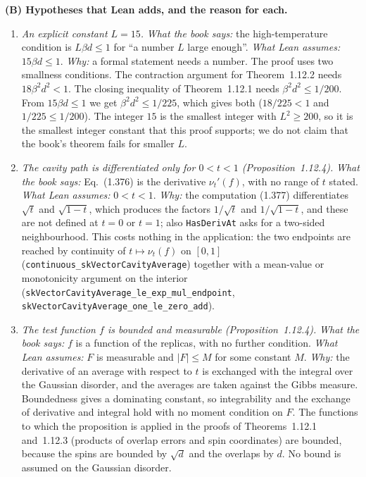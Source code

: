 \begin{remark}
\medskip\noindent\textbf{(B) Hypotheses that Lean adds, and the reason for each.}
\begin{enumerate}
\item \emph{An explicit constant $L=15$.}
\emph{What the book says:} the high-temperature condition is $L\beta d\le1$ for ``a number $L$ large enough''.
\emph{What Lean assumes:} $15\beta d\le1$.
\emph{Why:} a formal statement needs a number. The proof uses two smallness conditions. The contraction
argument for Theorem~1.12.2 needs $18\beta^2d^2<1$. The closing inequality of Theorem~1.12.1 needs
$\beta^2d^2\le 1/200$. From $15\beta d\le1$ we get $\beta^2d^2\le1/225$, which gives both
($18/225<1$ and $1/225\le1/200$). The integer $15$ is the smallest integer with $L^2\ge200$, so it is the
smallest integer constant that this proof supports; we do not claim that the book's theorem fails for
smaller $L$.
\item \emph{The cavity path is differentiated only for $0<t<1$ (Proposition~1.12.4).}
\emph{What the book says:} Eq.~(1.376) is the derivative $\nu_t'(f)$, with no range of $t$ stated.
\emph{What Lean assumes:} $0<t<1$.
\emph{Why:} the computation (1.377) differentiates $\sqrt t$ and $\sqrt{1-t}$, which produces the factors
$1/\sqrt t$ and $1/\sqrt{1-t}$, and these are not defined at $t=0$ or $t=1$; also \texttt{HasDerivAt} asks
for a two-sided neighbourhood. This costs nothing in the application: the two endpoints are reached by
continuity of $t\mapsto\nu_t(f)$ on $[0,1]$ (\texttt{continuous\_skVectorCavityAverage}) together with a
mean-value or monotonicity argument on the interior
(\texttt{skVectorCavityAverage\_le\_exp\_mul\_endpoint}, \texttt{skVectorCavityAverage\_one\_le\_zero\_add}).
\item \emph{The test function $f$ is bounded and measurable (Proposition~1.12.4).}
\emph{What the book says:} $f$ is a function of the replicas, with no further condition.
\emph{What Lean assumes:} $F$ is measurable and $|F|\le M$ for some constant $M$.
\emph{Why:} the derivative of an average with respect to $t$ is exchanged with the integral over the
Gaussian disorder, and the averages are taken against the Gibbs measure. Boundedness gives a dominating
constant, so integrability and the exchange of derivative and integral hold with no moment condition on
$F$. The functions to which the proposition is applied in the proofs of Theorems~1.12.1 and~1.12.3 (products
of overlap errors and spin coordinates) are bounded, because the spins are bounded by $\sqrt d$ and the
overlaps by $d$. No bound is assumed on the Gaussian disorder.

\end{enumerate}
\end{remark}
